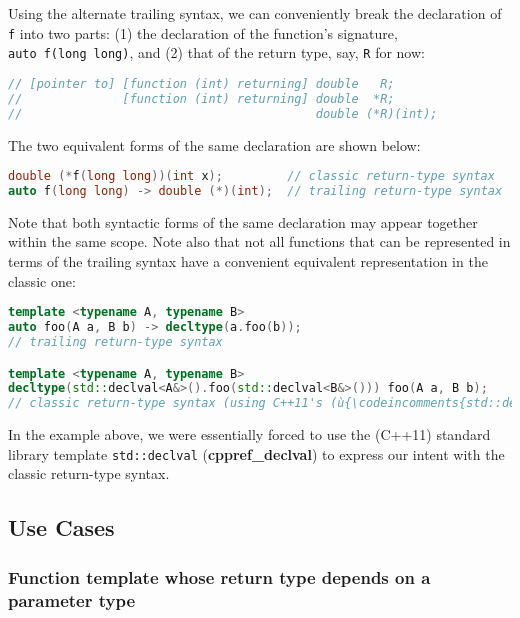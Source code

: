 \noindent Using the alternate trailing syntax, we can conveniently break the
declaration of \texttt{f} into two parts: (1) the declaration of the
function's signature, \texttt{auto}~\texttt{f(long}~\texttt{long)}, and (2) that of the return type, say, \texttt{R} for now:

\begin{lstlisting}[language=C++]
// [pointer to] [function (int) returning] double   R;
//              [function (int) returning] double  *R;
//                                         double (*R)(int);
\end{lstlisting}

\noindent The two equivalent forms of the same declaration are shown below:

\begin{lstlisting}[language=C++]
double (*f(long long))(int x);         // classic return-type syntax
auto f(long long) -> double (*)(int);  // trailing return-type syntax
\end{lstlisting}

\noindent Note that both syntactic forms of the same declaration may appear
together within the same scope. Note also that not all functions that
can be represented in terms of the trailing syntax have a convenient
equivalent representation in the classic one:

\begin{lstlisting}[language=C++]
template <typename A, typename B>
auto foo(A a, B b) -> decltype(a.foo(b));
// trailing return-type syntax

template <typename A, typename B>
decltype(std::declval<A&>().foo(std::declval<B&>())) foo(A a, B b);
// classic return-type syntax (using C++11's (ù{\codeincomments{std::declval}}ù))
\end{lstlisting}

\noindent In the example above, we were essentially forced to use the (C++11)
standard library template \texttt{std::declval}
(\textbf{{cppref\_declval}}) to express our intent with the classic
return-type syntax.

\subsection[Use Cases]{Use Cases}\label{use-cases}

\subsubsection[Function template whose return type depends on a parameter type]{Function template whose return type depends on a parameter type}\label{function-template-whose-return-type-depends-on-a-parameter-type}

